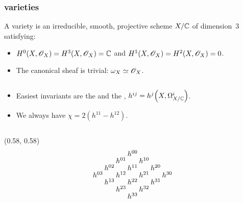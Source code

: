 \begin{frame}
\frametitle{\CY varieties}

\begin{definition}%
    A \alert{\CY variety} is an irreducible, smooth, projective scheme $X/\mathbb{C}$ of dimension~$3$ satisfying:
    \begin{itemize}
    	\item
	    $H^0(X, \mathscr{O}_X) = H^3(X, \mathscr{O}_X) = \mathbb{C}$ and $H^1(X, \mathscr{O}_X) = H^2(X, \mathscr{O}_X) = 0$.

	    \item
	    The canonical sheaf is trivial: $\omega_X \simeq \mathscr{O}_X$. 
    \end{itemize}
\end{definition}

\unskip
\begin{columns}[onlytextwidth]
    \begin{column}{0.6\textwidth}
        \begin{itemize}
	        \item
	        Easiest invariants are the  and the , $h^{ij} = h^j\Big(X, \Omega_{X/\mathbb{C}}^i\Big)\mkern-2mu$.

            \item
            We always have $\chi = 2(h^{11} - h^{12})$. 
        \end{itemize}
    \end{column}
\end{columns}

{
    \begin{textblock}{0.4}(0.58, 0.58)
        \[
            \arraycolsep = 1pt
            \def\arraystretch{0.5}
            \begin{array}[c]{ccccccc}
                &&& h^{00}                               \\  
                &&  h^{01} && h^{10}                     \\
                &   h^{02} && h^{11} && h^{20}           \\
                    h^{03} && h^{12} && h^{21} && h^{30} \\
                &   h^{13} && h^{22} && h^{31}           \\
                &&  h^{23} && h^{32}                     \\
                &&& h^{33} 
            \end{array}
        \]  
    \end{textblock}
}


\end{frame}
